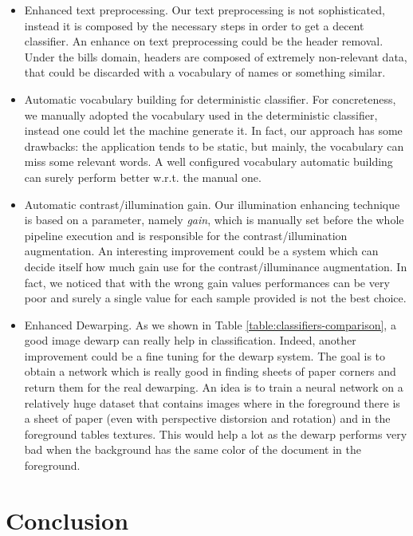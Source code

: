\documentclass[10pt,twocolumn,letterpaper]{article}
\begin{document}
\begin{itemize}
  \item Enhanced text preprocessing. Our text preprocessing is not
    sophisticated, instead it is composed by the necessary steps in
    order to get a decent classifier. An enhance on text preprocessing
    could be the header removal. Under the bills domain, headers are
    composed of extremely non-relevant data, that could be discarded
    with a vocabulary of names or something similar.
  \item Automatic vocabulary building for deterministic
    classifier. For concreteness, we manually adopted the vocabulary
    used in the deterministic classifier, instead one could let the
    machine generate it. In fact, our approach has some drawbacks: the
    application tends to be static, but mainly, the vocabulary can
    miss some relevant words. A well configured vocabulary automatic
    building can surely perform better w.r.t. the manual one.
  \item Automatic contrast/illumination gain. Our illumination
    enhancing technique is based on a parameter, namely \emph{gain},
    which is manually set before the whole pipeline execution and
    is responsible for the contrast/illumination augmentation. An
    interesting improvement could be a system which can decide itself
    how much gain use for the contrast/illuminance augmentation. In
    fact, we noticed that with the wrong gain values performances can
    be very poor and surely a single value for each sample provided
    is not the best choice.
  \item Enhanced Dewarping. As we shown in Table
    \ref{table:classifiers-comparison}, a good image dewarp can really
    help in classification. Indeed, another improvement could be a
    fine tuning for the dewarp system. The goal is to obtain a network
    which is really good in finding sheets of paper corners and return
    them for the real dewarping. An idea is to train a neural network
    on a relatively huge dataset that contains images where in the
    foreground there is a sheet of paper (even with perspective
    distorsion and rotation) and in the foreground tables
    textures. This would help a lot as the dewarp performs very bad
    when the background has the same color of the document in the
    foreground.
\end{itemize}

\section{Conclusion}
\label{sec:conclusion}
\end{document}
